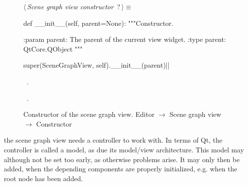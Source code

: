 \documentclass[%
    a4paper,    %
    justified,  %
    nobib,      %
    openany     %
]{tufte-book}
\makeatletter
\renewcommand{\label}[1]{\@tufte@label{##1}}%
\makeatother
\begin{document}
\begin{figure}
\begin{flushleft} \small
\begin{minipage}{\linewidth}\label{scrap41}\raggedright\small
{} $\langle\,${\itshape Scene graph view constructor}\nobreak\ {\footnotesize {?}}$\,\rangle\equiv$
\vspace{-1ex}
\begin{pythoncode}
def __init__(self, parent=None):
    """Constructor.

    :param parent: The parent of the current view widget.
    :type parent:  QtCore.QObject
    """

    super(SceneGraphView, self).__init__(parent)|\NWsep|
\end{pythoncode}
\vspace{1.5ex}
\footnotesize
\begin{list}{}{\setlength{\itemsep}{-\parsep}\setlength{\itemindent}{-\leftmargin}}
\item \NWtxtMacroDefBy\ .
\item \NWtxtMacroRefIn\ .

\item{}
\end{list}
\end{minipage}\vspace{4ex}
\end{flushleft}
\caption{Constructor of the scene graph view.
  \newline{}\newline{}Editor $\rightarrow$ Scene graph view
  $\rightarrow$ Constructor}
\label{editor:lst:scene-graph-view:constructor}
\end{figure}

 the scene graph view needs a
controller to work with. In terms of Qt, the controller is called a model, as
due its model/view architecture. This model may although not be set too early,
as otherwise problems arise. It may only then be added, when the depending
components are properly initialized, e.g. when the root node has been added.
\end{document}
